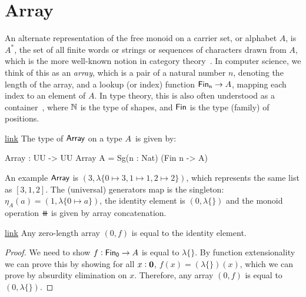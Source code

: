 \section{Array}\label{mon:array}

An alternate representation of the free monoid on a carrier set, or alphabet $A$, is $A^{\ast}$,
the set of all finite words or strings or sequences of characters drawn from $A$,
which is the more well-known notion in category theory~\cite{dubucFreeMonoids1974}.
%
In computer science, we think of this as an \emph{array},
which is a pair of a natural number $n$, denoting the length of the array,
and a lookup (or index) function $\Fin[n] \to A$, mapping each index to an element of $A$.
%
In type theory, this is also often understood as a container~\cite{abbottCategoriesContainers2003},
where $\mathbb{N}$ is the type of shapes, and $\Fin$ is the type (family) of positions.

\begin{definition}{\href{https://windtfw.com/agda-symmetries/Cubical.Structures.Set.Mon.Array.html#728}{link}}
    \label{def:arrays}
    The type of $\operatorname{\mathsf{Array}}$ on a type $A$~is given by:
\begin{code}
Array : UU -> UU
Array A = Sg(n : Nat) (Fin n -> A)
\end{code}
\end{definition}

An example $\operatorname{\mathsf{Array}}$ is $(3, \lambda\{ 0 \mapsto 3, 1 \mapsto 1, 2 \mapsto 2 \})$,
which represents the same list as $[3, 1, 2]$.
%
The (universal) generators map is the singleton: $\eta_A(a) = (1, \lambda\{ 0 \mapsto a \})$,
the identity element is $(0, \lambda\{\})$
and the monoid operation $\doubleplus$ is given by array concatenation.

\begin{lemma}{\href{https://windtfw.com/agda-symmetries/Cubical.Structures.Set.Mon.Array.html#7112}{link}}\label{array:zero-is-id}
    Any zero-length array $(0, f)$ is equal to the identity element.
\end{lemma}

\begin{proof}
    We need to show $f : \Fin[0] \to A$ is equal to $\lambda\{\}$. By function extensionality we can prove
    this by showing for all $x : {\mathbf{0}}$, $f(x) = (\lambda\{\})(x)$, which we can prove by absurdity elimination on $x$.
    Therefore, any array $(0, f)$ is equal to $(0, \lambda\{\})$.
\end{proof}

